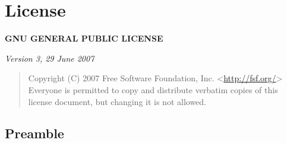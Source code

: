 \documentclass[letterpaper,10pt,english]{sphinxmanual}
\begin{document}
\section{License}
\label{docs/license::doc}\label{docs/license:license}\label{docs/license:id1}
\textbf{GNU GENERAL PUBLIC LICENSE}

\emph{Version 3, 29 June 2007}
\begin{quote}

Copyright (C) 2007 Free Software Foundation, Inc. \textless{}\href{http://fsf.org/}{http://fsf.org/}\textgreater{}
Everyone is permitted to copy and distribute verbatim copies
of this license document, but changing it is not allowed.
\end{quote}


\subsection{Preamble}
\end{document}
